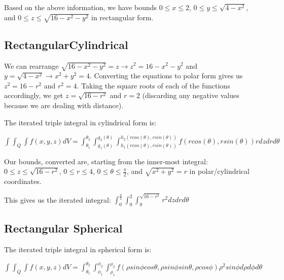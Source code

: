 \documentclass{article}
\begin{document}
\par\noindent\large Based on the above information, we have bounds $0 \leq x \leq 2$, $0 \leq y \leq \sqrt{4 - x^{2}}$, and $0 \leq z \leq \sqrt{16 - x^{2} - y^{2}}$ in rectangular form.

\subsection{Rectangular\textrightarrow Cylindrical}
\par\noindent\large  We can rearrange $\sqrt{16 - x^{2} - y^{2}} = z \rightarrow z^{2} = 16 - x^{2} - y^{2}$ and $y = \sqrt{4 - x^{2}} \rightarrow x^{2} + y^{2} = 4$.  Converting the equations to polar form gives us $z^{2} = 16 - r^{2}$ and $r^{2} = 4$.  Taking the square roots of each of the functions accordingly, we get $z = \sqrt{16 - r^{2}}$ and $r = 2$ (discarding any negative values because we are dealing with distance).\vspace{0.25cm}

\par\noindent The iterated triple integral in cylindrical form is:
\par\noindent\Large $\int\int_{Q}\int f(x, y, z)dV = \int_{\theta_{1}}^{\theta_{2}}\int_{g_{1}(\theta)}^{g_{2}(\theta)}\int_{h_{1}(rcos(\theta), rsin(\theta))}^{h_{2}(rcos(\theta), rsin(\theta))}f(rcos(\theta), rsin(\theta))r dzdrd\theta$

\par\noindent\large Our bounds, converted are, starting from the inner-most integral: $0 \leq z \leq \sqrt{16 - r^{2}}$, $0 \leq r \leq 4$, $0 \leq \theta \leq \frac{\pi}{2}$, and $\sqrt{x^{2} + y^{2}} = r$ in polar/cylindrical coordinates.\vspace{0.25cm}

\par\noindent\Large This gives us the iterated integral: $\int_{0}^{\frac{\pi}{2}}\int_{0}^{2}\int_{0}^{\sqrt{16 - r^{2}}}r^{2} dzdrd\theta$

\subsection{Rectangular \textrightarrow Spherical}
\par\noindent\large The iterated triple integral in spherical form is:
\par\noindent\Large $\int\int_{Q}\int f(x, y, z)dV = \int_{\theta_{1}}^{\theta_{2}}\int_{\phi_{1}}^{\phi_{2}}\int_{\rho_{1}}^{\rho_{2}}f(\rho sin\phi cos\theta, \rho sin\phi sin\theta, \rho cos\phi)\rho^{2}sin\phi d\rho d\phi d\theta$\vspace{0.25cm}
\end{document}
